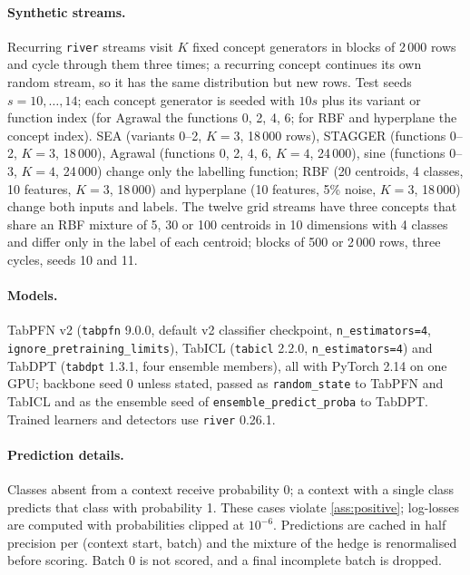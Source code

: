 \paragraph{Synthetic streams.} Recurring \texttt{river} streams visit $K$ fixed concept generators in blocks of 2\,000
rows and cycle through them three times; a recurring concept continues its own random stream, so it has the same
distribution but new rows. Test seeds $s=10,\dots,14$; each concept generator is seeded with $10s$ plus its variant or function index
(for Agrawal the functions 0, 2, 4, 6; for RBF and hyperplane the concept index). SEA (variants 0--2, $K=3$, 18\,000 rows),
STAGGER (functions 0--2, $K=3$, 18\,000), Agrawal (functions 0, 2, 4, 6, $K=4$, 24\,000), sine (functions 0--3,
$K=4$, 24\,000) change only the labelling function; RBF (20 centroids, 4 classes, 10 features, $K=3$, 18\,000) and
hyperplane (10 features, 5\% noise, $K=3$, 18\,000) change both inputs and labels. The twelve grid streams have three
concepts that share an RBF mixture of 5, 30 or 100 centroids in 10 dimensions with 4 classes and differ only in the
label of each centroid; blocks of 500 or 2\,000 rows, three cycles, seeds 10 and 11.

\paragraph{Models.} TabPFN v2 (\texttt{tabpfn} 9.0.0, default v2 classifier checkpoint, \texttt{n\_estimators=4},
\texttt{ignore\_pretraining\_limits}), TabICL (\texttt{tabicl} 2.2.0, \texttt{n\_estimators=4}) and TabDPT
(\texttt{tabdpt} 1.3.1, four ensemble members), all with PyTorch 2.14 on one GPU; backbone seed 0 unless stated, passed as
\texttt{random\_state} to TabPFN and TabICL and as the ensemble seed of \texttt{ensemble\_predict\_proba} to TabDPT. Trained learners and detectors use \texttt{river} 0.26.1. %

\paragraph{Prediction details.} Classes absent from a context receive probability 0; a context with a single class
predicts that class with probability 1. These cases violate \cref{ass:positive}; log-losses are computed with
probabilities clipped at $10^{-6}$. Predictions are cached in half precision per (context start, batch) and the
mixture of the hedge is renormalised before scoring. Batch 0 is not scored, and a final incomplete batch is dropped.

